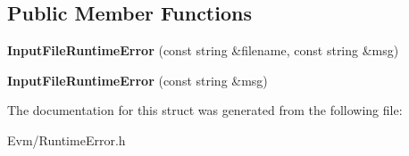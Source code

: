 \subsection*{Public Member Functions}
\begin{DoxyCompactItemize}
\item 
\mbox{\label{struct_evm_1_1_input_file_runtime_error_a082b779e70ab0d60fa26079884509c10}} 
{\bfseries Input\+File\+Runtime\+Error} (const string \&filename, const string \&msg)
\item 
\mbox{\label{struct_evm_1_1_input_file_runtime_error_a2b41c85cb364913cb5f0a47bcd273cf3}} 
{\bfseries Input\+File\+Runtime\+Error} (const string \&msg)
\end{DoxyCompactItemize}


The documentation for this struct was generated from the following file\+:\begin{DoxyCompactItemize}
\item 
Evm/Runtime\+Error.\+h\end{DoxyCompactItemize}
